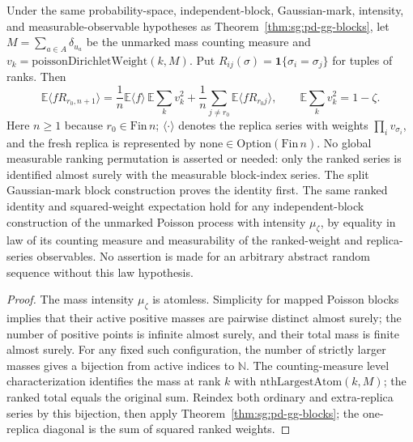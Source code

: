 \begin{theorem}\label{thm:sg:pd-gg-ranked}
  \leanok
Under the same probability-space, independent-block, Gaussian-mark, intensity, and measurable-observable hypotheses as Theorem~\ref{thm:sg:pd-gg-blocks}, let $M=\sum_{a\in A}\delta_{u_a}$ be the unmarked mass counting measure and $v_k=\mathrm{poissonDirichletWeight}(k,M)$. Put $R_{ij}(\sigma)=\mathbf1\{\sigma_i=\sigma_j\}$ for tuples of ranks. Then
\[
\mathbb E\langle fR_{r_0,n+1}\rangle
=\frac1n\mathbb E\langle f\rangle\,\mathbb E\sum_kv_k^2
 +\frac1n\sum_{j\ne r_0}\mathbb E\langle fR_{r_0j}\rangle,
\qquad \mathbb E\sum_kv_k^2=1-\zeta.
\]
Here $n\ge1$ because $r_0\in\mathrm{Fin}\,n$; $\langle\cdot\rangle$ denotes the replica series with weights $\prod_i v_{\sigma_i}$, and the fresh replica is represented by $\mathrm{none}\in\mathrm{Option}(\mathrm{Fin}\,n)$. No global measurable ranking permutation is asserted or needed: only the ranked series is identified almost surely with the measurable block-index series. The split Gaussian-mark block construction proves the identity first. The same ranked identity and squared-weight expectation hold for any independent-block construction of the unmarked Poisson process with intensity $\mu_\zeta$, by equality in law of its counting measure and measurability of the ranked-weight and replica-series observables. No assertion is made for an arbitrary abstract random sequence without this law hypothesis.
\end{theorem}
\begin{proof}
  \leanok
The mass intensity $\mu_\zeta$ is atomless. Simplicity for mapped Poisson blocks implies that their active positive masses are pairwise distinct almost surely; the number of positive points is infinite almost surely, and their total mass is finite almost surely. For any fixed such configuration, the number of strictly larger masses gives a bijection from active indices to $\mathbb N$. The counting-measure level characterization identifies the mass at rank $k$ with $\mathrm{nthLargestAtom}(k,M)$; the ranked total equals the original sum. Reindex both ordinary and extra-replica series by this bijection, then apply Theorem~\ref{thm:sg:pd-gg-blocks}; the one-replica diagonal is the sum of squared ranked weights.
\end{proof}

